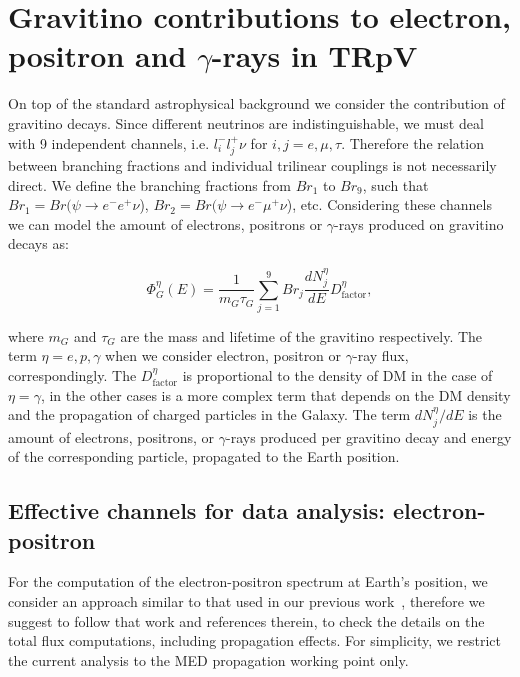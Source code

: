 \documentclass[a4paper,11pt]{article}
\begin{document}
\section{Gravitino contributions to electron, positron and $\gamma$-rays in TRpV}

On top of the standard astrophysical background we consider the contribution of gravitino decays. Since different neutrinos are indistinguishable, we must deal with 9 independent channels, i.e. $l^{-}_i l^{+}_j\nu$ for $i,j=e,\mu,\tau$. Therefore the relation between branching fractions and individual trilinear couplings is not necessarily direct. We define the branching fractions from $Br_1$ to $Br_9$, such that $Br_1 = Br(\psi \rightarrow e^{-}e^{+}\nu$), $Br_2 = Br(\psi \rightarrow e^{-}\mu^{+}\nu$), etc. Considering these channels we can  model the amount of electrons, positrons or $\gamma$-rays produced on gravitino decays as:

\begin{equation}
\Phi_{G}^{\eta}(E) = \frac{1}{m_G \tau_G} \sum_{j=1}^9 {Br_j \frac{dN_j^{\eta}}{dE}} D^{\eta}_{\text{factor}},
\label{dm-flux}
\end{equation}

\noindent where $m_G$ and $\tau_G$ are the mass and lifetime of the gravitino respectively. The term $\eta = e, p,\gamma$ when we consider electron, positron or $\gamma$-ray flux, correspondingly. The $D^{\eta}_{\text{factor}}$ is proportional to the density of DM in the case of $\eta=\gamma$, in the other cases is a more complex term that depends on the DM density and the propagation of charged particles in the Galaxy. The term $dN_j^{\eta}/dE$ is the amount of electrons, positrons, or $\gamma$-rays produced per gravitino decay and energy of the corresponding particle, propagated to the Earth position.

\subsection*{Effective channels for data analysis: electron-positron}

For the computation of the electron-positron spectrum at Earth's position, we consider an approach similar to that used in our previous work~\cite{Carquin:2015uma}, therefore we suggest to follow that work and references therein, to check the details on the total flux computations, including propagation effects. For simplicity, we restrict the current analysis to the MED propagation working point only.
\end{document}
